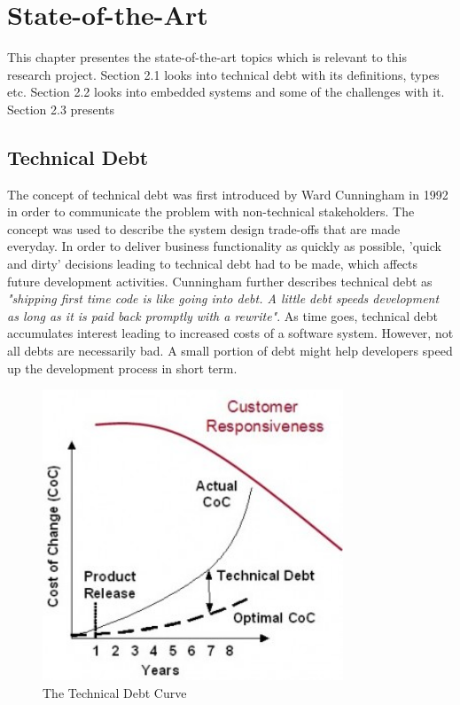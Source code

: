 \chapter{State-of-the-Art}

This chapter presentes the state-of-the-art topics which is relevant to this research project. Section 2.1 looks into technical debt with its definitions, types etc. Section 2.2 looks into embedded systems and some of the challenges with it. Section 2.3 presents 


\section{Technical Debt}
The concept of technical debt was first introduced by Ward Cunningham in 1992 in order to communicate the problem with non-technical stakeholders\cite{p29-cunningham}. The concept was used to describe the system design trade-offs that are made everyday. In order to deliver business functionality as quickly as possible, 'quick and dirty' decisions leading to technical debt had to be made, which affects future development activities. Cunningham further describes technical debt as \textit{"shipping first time code is like going into debt. A little debt speeds development as long as it is paid back promptly with a rewrite"}. As time goes, technical debt accumulates interest leading to increased costs of a software system\cite{p31-guo,p35-klinger}. However, not all debts are necessarily bad. A small portion of debt might help developers speed up the development process in short term\cite{p31-guo}. 


\begin{figure}
	\centering
	\includegraphics[width=0.8\textwidth]{images/techdebtCurve.jpg}
	\caption{The Technical Debt Curve\cite{jim-highsmith}}
	\label{fig:techDebtCurve}
\end{figure}

